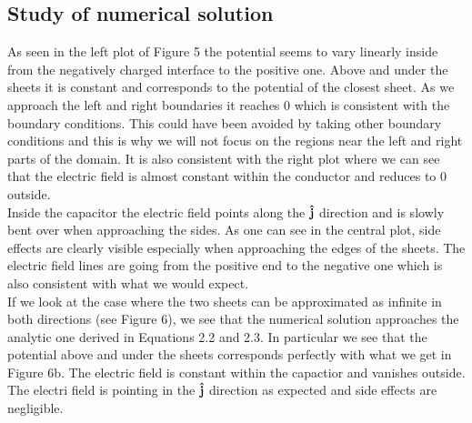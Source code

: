 \documentclass[10 pt]{article}
\numberwithin{equation}{section}
\begin{document}
\begin{multicols}{2}

\subsection{Study of numerical solution}
As seen in the left plot of Figure 5 the potential seems to vary linearly inside from the negatively charged interface to the positive one. Above and under the sheets it is constant and corresponds to the potential of the closest sheet. As we approach the left and right boundaries it reaches 0 which is consistent with the boundary conditions. This could have been avoided by taking other boundary conditions and this is why we will not focus on the regions near the left and right parts of the domain. It is also consistent with the right plot where we can see that the electric field is almost constant within the conductor and reduces to 0  outside.\\
Inside the capacitor the electric field points along the $\bf \hat j$ direction and is slowly bent over when approaching the sides. As one can see in the central plot, side effects are clearly visible especially when approaching the edges of the sheets. The electric field lines are going from the positive end to the negative one which is also consistent with what we would expect.\\
If we look at the case where the two sheets can be approximated as infinite in both directions (see Figure 6), we see that the numerical solution approaches the analytic one derived in Equations 2.2 and 2.3. In particular we see that the potential above and under the sheets corresponds perfectly with what we get in Figure 6b. The electric field is constant within the capactior and vanishes outside. The electri field is pointing in the $\bf \hat j$ direction as expected and side effects are negligible.


\end{multicols}
\end{document}
